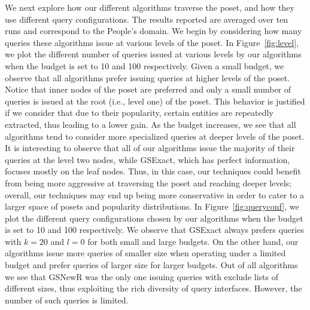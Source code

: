 \vspace{3pt}
We next explore how our different algorithms traverse the poset, and how they use different query configurations. The results reported are averaged over ten runs and correspond to the People's domain. We begin by considering how many queries these algorithms issue at various levels of the poset. In Figure~\ref{fig:level}, we plot the different number of queries issued at various levels by our algorithms when the budget is set to 10 and 100 respectively. Given a small budget, we observe that all algorithms prefer issuing queries at higher levels of the poset. Notice that inner nodes of the poset are preferred and only a small number of queries is issued at the root (i.e., level one) of the poset. This behavior is justified if we consider that due to their popularity, certain entities are repeatedly extracted, thus leading to a lower gain. As the budget increases, we see that all algorithms tend to consider more specialized queries at deeper levels of the poset. It is interesting to observe that all of our algorithms issue the majority of their queries at the level two nodes, while GSExact, which has perfect information, focuses mostly on the leaf nodes. Thus, in this case, our techniques could benefit from being more aggressive at traversing the poset and reaching deeper levels; overall, our techniques may end up being more conservative in order to cater to a larger space of posets and popularity distributions. In Figure~\ref{fig:queryconf}, we plot the different query configurations chosen by our algorithms when the budget is set to 10 and 100 respectively. We observe that GSExact always prefers queries with $k = 20$ and $l = 0$ for both small and large budgets. On the other hand, our algorithms issue more queries of smaller size when operating under a limited budget and prefer queries of larger size for larger budgets. Out of all algorithms we see that GSNewR was the only one issuing queries with exclude lists of different sizes, thus exploiting the rich diversity of query interfaces. However, the number of such queries is limited. 


